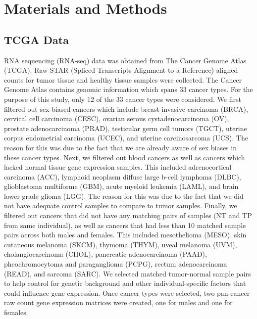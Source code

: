 \documentclass[10pt]{article}
\begin{document}
\newpage
\section{Materials and Methods} 


	\subsection{TCGA Data}
	
	RNA sequencing (RNA-seq) data was obtained from The Cancer Genome Atlas (TCGA). Raw STAR (Spliced Transcripts Alignment to a Reference) aligned counts for tumor tissue and healthy tissue samples were collected. The Cancer Genome Atlas contains genomic information which spans 33 cancer types. For the purpose of this study, only 12 of the 33 cancer types were considered. We first filtered out sex-biased cancers which include breast invasive carcinoma (BRCA), cervical cell carcinoma (CESC), ovarian serous cystadenocarcinoma (OV), prostate adenocarcinoma (PRAD), testicular germ cell tumors (TGCT), uterine corpus endometrial carcinoma (UCEC), and uterine carcinosarcoma (UCS). The reason for this was due to the fact that we are already aware of sex biases in these cancer types. Next, we filtered out blood cancers as well as cancers which lacked normal tissue gene expression samples. This included adrenocortical carcinoma (ACC), lymphoid neoplasm diffuse large b-cell lymphoma (DLBC), glioblastoma multiforme (GBM), acute myeloid leukemia (LAML), and brain lower grade glioma (LGG). The reason for this was due to the fact that we did not have adequate control samples to compare to tumor samples. Finally, we filtered out cancers that did not have any matching pairs of samples (NT and TP from same individual), as well as cancers that had less than 10 matched sample pairs across both males and females. This included mesothelioma (MESO), skin cutaneous melanoma (SKCM), thymoma (THYM), uveal melanoma (UVM), cholangiocarcinoma (CHOL), pancreatic adenocarcinoma (PAAD), pheochromocytoma and paraganglioma (PCPG), rectum adenocarcinoma (READ), and sarcoma (SARC). We selected matched tumor-normal sample pairs to help control for genetic background and other individual-specific factors that could influence gene expression. Once cancer types were selected, two pan-cancer raw count gene expression matrices were created, one for males and one for females.
	
\end{document}
